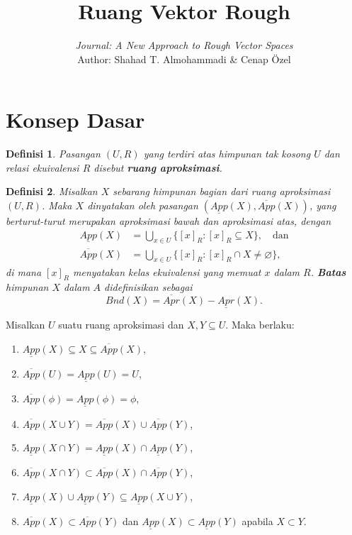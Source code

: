 \documentclass[a4paper,11pt]{article}
\title{\textbf{Ruang Vektor Rough}\\[0.4em]
\large}
\author{\textit{Journal: A New Approach to Rough Vector Spaces}\\
Author: Shahad T. Almohammadi \& Cenap \"Ozel}
\date{}
\theoremstyle{plain}
\newtheorem{definisi}{Definisi}
\newcommand{\upp}[1]{\overline{App}(#1)}
\newcommand{\lowp}[1]{\underline{App}(#1)}
\newcommand{\upr}[1]{\overline{Apr}(#1)}
\newcommand{\lowr}[1]{\underline{Apr}(#1)}
\begin{document}
\maketitle
\section{Konsep Dasar}

\begin{definisi}\label{def:1}
      Pasangan $(U,R)$ yang terdiri atas himpunan tak kosong $U$ dan relasi
      ekuivalensi $R$ disebut \textbf{ruang aproksimasi}.
\end{definisi}

\begin{definisi}\label{def:2}
      Misalkan $X$ sebarang himpunan bagian dari ruang aproksimasi $(U,R)$.
      Maka $X$ dinyatakan oleh pasangan $(\lowp{X},\upp{X})$, yang
      berturut-turut merupakan aproksimasi bawah dan aproksimasi atas, dengan
      \begin{align*}
            \lowp{X} & =\bigcup_{x\in U}\{[x]_R:[x]_R\subseteq X\},\quad\text{dan} \\
            \upp{X}  & =\bigcup_{x\in U}\{[x]_R:[x]_R\cap X\ne\varnothing\},
      \end{align*}
      di mana $[x]_R$ menyatakan kelas ekuivalensi yang memuat $x$ dalam $R$.
      \textbf{Batas} himpunan $X$ dalam $A$ didefinisikan sebagai
      \[
            Bnd(X)=\upr{X}-\lowr{X}.
      \]
\end{definisi}

Misalkan $U$ suatu ruang aproksimasi dan $X,Y\subseteq U$. Maka berlaku:
\begin{enumerate}
      \item $\lowp{X}\subseteq X\subseteq\upp{X}$,
      \item $\upp{U}=\lowp{U}=U$,
      \item $\upp{\phi}=\lowp{\phi}=\phi$,
      \item $\upp{X\cup Y}=\upp{X}\cup\upp{Y}$,
      \item $\lowp{X\cap Y}=\lowp{X}\cap\lowp{Y}$,
      \item $\upp{X\cap Y}\subset\upp{X}\cap\upp{Y}$,
      \item $\lowp{X}\cup\lowp{Y}\subseteq\lowp{X\cup Y}$,
      \item $\upp{X}\subset\upp{Y}$ dan $\lowp{X}\subset\lowp{Y}$
            apabila $X\subset Y$.
\end{enumerate}
\end{document}
